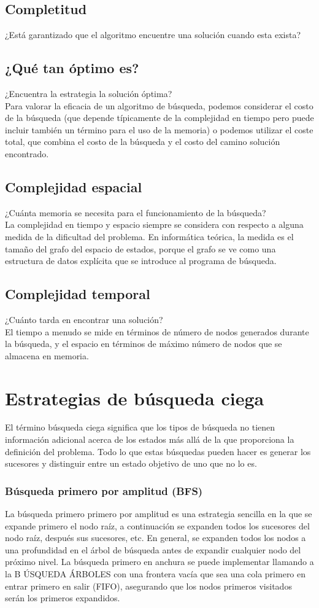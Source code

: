 \documentclass[12pt,a4paper]{report}
\begin{document}
\subsection*{Completitud}
¿Está garantizado que el algoritmo encuentre una solución cuando esta exista?
\subsection*{¿Qué tan óptimo es?}
¿Encuentra la estrategia la solución óptima?\\Para valorar la eficacia de un algoritmo de búsqueda, podemos considerar el costo de la búsqueda (que depende típicamente de la complejidad en tiempo pero puede incluir también un término para el uso de la memoria) o podemos utilizar el coste total, que combina el costo de la búsqueda y el costo del camino solución encontrado.
\subsection*{Complejidad espacial}
¿Cuánta memoria se necesita para el funcionamiento de la búsqueda?\\La complejidad en tiempo y espacio siempre se considera con respecto a alguna medida de la dificultad del problema. En informática teórica, la medida es el tamaño del grafo del espacio de estados, porque el grafo se ve como una estructura de datos explícita que se introduce al programa de búsqueda.
\subsection*{Complejidad temporal}
¿Cuánto tarda en encontrar una solución?\\El tiempo a menudo se mide en términos de número de nodos generados durante la búsqueda, y el espacio en términos de máximo número de nodos que se almacena en memoria.
\section{Estrategias de búsqueda ciega}
El término búsqueda ciega significa que los tipos de búsqueda no tienen información adicional acerca de los estados más allá de la que proporciona la definición del problema. Todo lo que estas búsquedas pueden hacer es generar los sucesores y distinguir entre un estado objetivo de uno que no lo es.
\subsubsection*{Búsqueda primero por amplitud (BFS)}
La búsqueda primero primero por amplitud es una estrategia sencilla en la que se expande primero el nodo raíz, a continuación se expanden todos los sucesores del nodo raíz, después sus sucesores, etc. En general, se expanden todos los nodos a una profundidad en el árbol de búsqueda antes de expandir cualquier nodo del próximo nivel. La búsqueda primero en anchura se puede implementar llamando a la B ÚSQUEDA ÁRBOLES con una frontera vacía que sea una cola primero en entrar primero en salir (FIFO), asegurando que los nodos primeros visitados serán los primeros expandidos.
\end{document}
